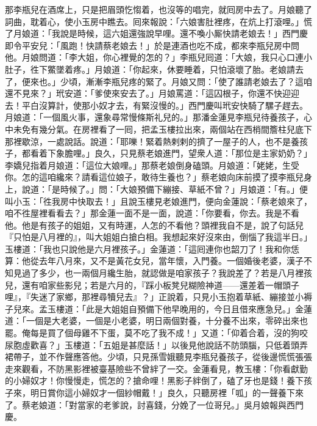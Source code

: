 那李瓶兒在酒席上，只是把眉頭忔㥮着，{}也沒等的唱完，就囘房中去了。月娘聽了詞曲，耽着心，使小玉房中瞧去。囘來報說：「六娘害肚裡疼，在炕上打滾哩。」慌了月娘道：「我說是時候，這六姐還強說早哩。還不喚小厮快請老娘去！」西門慶即令平安兒：「風跑！快請蔡老娘去！」於是連酒也吃不成，都來李瓶兒房中問他。月娘問道：「李大姐，你心裡覺的怎的？」李瓶兒囘道：「大娘，我只心口連小肚子，徃下鱉墜着疼。」月娘道：「你起來，休要睡着，只怕滾壞了胎。老娘請去了，便來也。」少頃，漸漸李瓶兒疼的緊了。月娘又問：「使了誰請老娘去了？這咱還不見來？」玳安道：「爹使來安去了。」月娘罵道：「這囚根子，你還不快迎迎去！平白沒算計，使那小奴才去，有緊沒慢的。」{}西門慶叫玳安快騎了騾子趕去。月娘道：「一個風火事，還象尋常慢條斯礼兒的。」那潘金蓮見李瓶兒待養孩子，心中未免有幾分氣。在房裡看了一囘，把孟玉樓拉出來，兩個站在西梢間簷柱兒底下那裡歇涼，一處說話。說道：「耶嚛！緊着熱剌剌的擠了一屋子的人，也不是養孩子，都看着下象膽哩。」良久，只見蔡老娘進門，望衆人道：「那位是主家奶奶？」李嬌兒指着月娘道：「這位大娘哩。」那蔡老娘倒身磕頭。月娘道：「姥姥，生受你。怎的這咱纔來？請看這位娘子，敢待生養也？」蔡老娘向床前摸了摸李瓶兒身上，說道：「是時候了。」問：「大娘預備下繃接、草紙不曾？」月娘道：「有。」{}便叫小玉：「徃我房中快取去！」{}且說玉樓見老娘進門，便向金蓮說：「蔡老娘來了，咱不徃屋裡看看去？」那金蓮一面不是一面，說道：「你要看，你去。我是不看他。他是有孩子的姐姐，又有時運，人怎的不看他？頭裡我自不是，說了句話兒『只怕是八月裡的』，叫大姐姐白搶白相。我想起來好沒來由，倒惱了我這半日。」玉樓道：「我也只說他是六月裡孩子。」金蓮道：「這囘連你也韶刀了！我和你恁算：他從去年八月來，又不是黃花女兒，當年懷，入門養。一個婚後老婆，漢子不知見過了多少，也一兩個月纔生胎，就認做是咱家孩子？我說差了？若是八月裡孩兒，還有咱家些影兒；若是六月的，『踩小板凳兒糊險神道——還差着一帽頭子哩』，『失迷了家鄉，那裡尋犢兒去』？」{}正說着，只見小玉抱着草紙、繃接並小褥子兒來。孟玉樓道：「此是大姐姐自預備下他早晚用的，今日且借來應急兒。」{}金蓮道：「一個是大老婆，一個是小老婆，明日兩個對養，十分養不出來，零碎出來也罷。俺每是買了個母雞不下蛋，莫不吃了我不成！」{}又道：「仰着合着，沒的狗咬尿胞虛歡喜？」玉樓道：「五姐是甚麼話！」以後見他說話不防頭腦，只低着頭弄裙帶子，{}並不作聲應答他。少頃，只見孫雪娥聽見李瓶兒養孩子，從後邊慌慌張張走來觀看，不防黑影裡被臺基險些不曾絆了一交。金蓮看見，教玉樓：「你看獻勤的小婦奴才！你慢慢走，慌怎的？搶命哩！黑影子絆倒了，磕了牙也是錢！養下孩子來，明日賞你這小婦奴才一個紗帽戴！」{}良久，只聽房裡「呱」的一聲養下來了。{}蔡老娘道：「對當家的老爹說，討喜錢，分娩了一位哥兒。」吳月娘報與西門慶。

